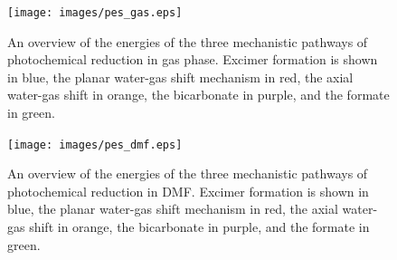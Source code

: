 \begin{landscape}
\begin{figure}[!htbp]
\end{figure} 
\begin{figure}[!htbp]
 \begin{center}
  \texttt{[image: images/pes\_gas.eps]}
 \end{center}
\caption[An overview of the energies of the three mechanistic pathways of photochemical  reduction in gas phase.]{An overview of the energies of the three mechanistic pathways of photochemical  reduction in gas phase. Excimer formation is shown in blue, the planar water-gas shift mechanism in red, the axial water-gas shift in orange, the bicarbonate in purple, and the formate in green.}
\label{fig.apes_gas}
\end{figure} 

\begin{figure}[!htbp]
 \begin{center}
  \texttt{[image: images/pes\_dmf.eps]}
 \end{center}
\caption[An overview of the energies of the three mechanistic pathways of photochemical  reduction in DMF.]{An overview of the energies of the three mechanistic pathways of photochemical  reduction in DMF. Excimer formation is shown in blue, the planar water-gas shift mechanism in red, the axial water-gas shift in orange, the bicarbonate in purple, and the formate in green.}
\label{fig.apes_dmf}
\end{figure} 

\end{landscape}